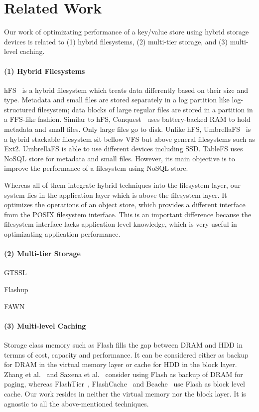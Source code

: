 \section{Related Work} 
\label{sec:related} 
Our work of optimizating performance of a key/value store using hybrid
storage devices is related to (1) hybrid filesystems, (2) multi-tier
storage, and (3) multi-level caching. 

\paragraph{(1) Hybrid Filesystems}

hFS~\cite{eurosys_hfs} is a hybrid filesystem which treats data
differently based on their size and type. Metadata and small files are
stored separately in a log partition like log-structured filesystem;
data blocks of large regular files are stored in a partition in a
FFS-like fashion. Similar to hFS, Conquest~\cite{conquest_tos} uses
battery-backed RAM to hold metadata and small files. Only large files
go to disk. Unlike hFS, UmbrellaFS~\cite{umbrellafs_gos} is a hybrid
stackable filesystem sit bellow VFS but above general filesystems such
as Ext2.  UmbrellaFS is able to use different devices including SSD.
TableFS \cite{tablefs} uses NoSQL store for metadata and small files.
However, its main objective is to improve the performance of a
filesystem using NoSQL store.

Whereas all of them integrate hybrid techniques into the filesystem
layer, our system lies in the application layer which is above the
filesystem layer. It optimizes the operations of an object store,
which provides a different interface from the POSIX filesystem
interface. This is an important difference because the filesystem
interface lacks application level knowledge, which is very useful in
optimizating application performance.

\paragraph{(2) Multi-tier Storage}
%
GTSSL~\cite{socc11chisl}

Flashup~\cite{vldb_flashup}

FAWN~\cite{sosp09fawn}

\paragraph{(3) Multi-level Caching}
%
Storage class memory such as Flash fills the gap between DRAM and HDD
in termns of cost, capacity and performance. It can be considered
either as backup for DRAM in the virtual memory layer or cache for HDD
in the block layer. Zhang et al.~\cite{zhang2012multi} and Saxena et
al.~\cite{flashvm} consider using Flash as backup of DRAM for paging,
whereas FlashTier~\cite{eurosys_12_flashtier},
FlashCache~\cite{flashcache} and Bcache~\cite{bcache} use Flash as
block level cache. Our work resides in neither the virtual memory nor
the block layer. It is agnostic to all the above-mentioned techniques.

